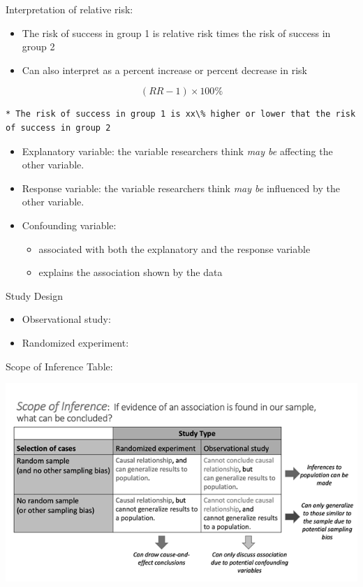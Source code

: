 \documentclass[
]{report}
\providecommand{\tightlist}{%
  \setlength{\itemsep}{0pt}\setlength{\parskip}{0pt}}
\begin{document}
Interpretation of relative risk:

\begin{itemize}
\item
  The risk of success in group 1 is relative risk times the risk of success in group 2
\item
  Can also interpret as a percent increase or percent decrease in risk
\end{itemize}

\[(RR-1) \times 100\%\]

\begin{verbatim}
* The risk of success in group 1 is xx\% higher or lower that the risk of success in group 2
\end{verbatim}

\begin{itemize}
\item
  Explanatory variable: the variable researchers think \emph{may be} affecting the other variable.
\item
  Response variable: the variable researchers think \emph{may be} influenced by the other variable.
\item
  Confounding variable:

  \begin{itemize}
  \tightlist
  \item
    associated with both the explanatory and the response variable
  \item
    explains the association shown by the data
  \end{itemize}
\end{itemize}

Study Design

\begin{itemize}
\item
  Observational study:
\item
  Randomized experiment:
\end{itemize}

Scope of Inference Table:

\begin{center}\includegraphics[width=0.65\linewidth]{images/ScopeOfInferenceGreyscale} \end{center}
\end{document}
